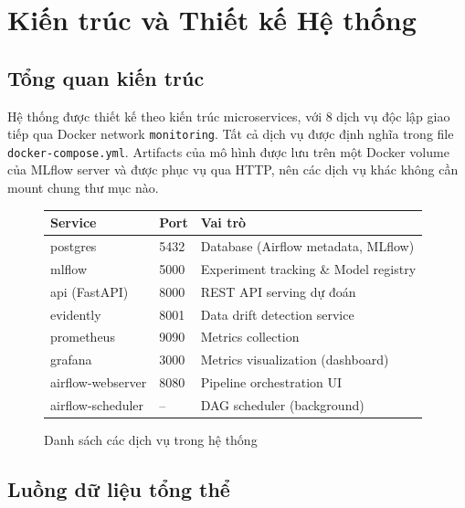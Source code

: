 \documentclass[12pt,a4paper]{report}
\begin{document}
\chapter{Kiến trúc và Thiết kế Hệ thống}

\section{Tổng quan kiến trúc}

Hệ thống được thiết kế theo kiến trúc microservices, với 8 dịch vụ độc lập giao tiếp qua Docker network \texttt{monitoring}. Tất cả dịch vụ được định nghĩa trong file \texttt{docker-compose.yml}. Artifacts của mô hình được lưu trên một Docker volume của MLflow server và được phục vụ qua HTTP, nên các dịch vụ khác không cần mount chung thư mục nào.

\begin{figure}[H]
  \centering
  \begin{tcolorbox}[colback=gray!5, colframe=gray!40, arc=5pt, boxrule=1pt]
    \ttfamily\small
    \begin{tabular}{lll}
      \toprule
      \textbf{Service} & \textbf{Port} & \textbf{Vai trò} \\
      \midrule
      postgres        & 5432  & Database (Airflow metadata, MLflow) \\
      mlflow          & 5000  & Experiment tracking \& Model registry \\
      api (FastAPI)   & 8000  & REST API serving dự đoán \\
      evidently       & 8001  & Data drift detection service \\
      prometheus      & 9090  & Metrics collection \\
      grafana         & 3000  & Metrics visualization (dashboard) \\
      airflow-webserver & 8080 & Pipeline orchestration UI \\
      airflow-scheduler & --  & DAG scheduler (background) \\
      \bottomrule
    \end{tabular}
  \end{tcolorbox}
  \caption{Danh sách các dịch vụ trong hệ thống}
  \label{tab:services}
\end{figure}

\section{Luồng dữ liệu tổng thể}
\end{document}

